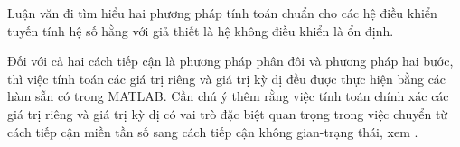 Luận văn đi tìm hiểu hai phương pháp tính toán chuẩn \hinf cho các hệ điều khiển tuyến tính hệ số hằng với giả thiết là hệ không điều khiển là ổn định.

\medskip
Đối với cả hai cách tiếp cận là phương pháp phân đôi và phương pháp hai bước, thì việc tính toán các giá trị riêng và giá trị kỳ dị đều được thực hiện bằng các hàm sẵn có trong MATLAB. Cần chú ý thêm rằng việc tính toán chính xác các giá trị riêng và giá trị kỳ dị có vai trò đặc biệt quan trọng trong việc chuyển từ cách tiếp cận miền tần số sang cách tiếp cận không gian-trạng thái, xem \cite{16}.